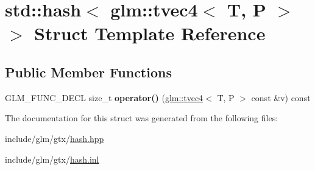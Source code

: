 \hypertarget{structstd_1_1hash_3_01glm_1_1tvec4_3_01T_00_01P_01_4_01_4}{}\section{std\+:\+:hash$<$ glm\+:\+:tvec4$<$ T, P $>$ $>$ Struct Template Reference}
\label{structstd_1_1hash_3_01glm_1_1tvec4_3_01T_00_01P_01_4_01_4}
\subsection*{Public Member Functions}
\begin{DoxyCompactItemize}
\item 
\mbox{\label{structstd_1_1hash_3_01glm_1_1tvec4_3_01T_00_01P_01_4_01_4_a019cfa9e9c08d44625fde235650a03dc}} 
G\+L\+M\+\_\+\+F\+U\+N\+C\+\_\+\+D\+E\+CL size\+\_\+t {\bfseries operator()} (\hyperlink{structglm_1_1tvec4}{glm\+::tvec4}$<$ T, P $>$ const \&v) const
\end{DoxyCompactItemize}


The documentation for this struct was generated from the following files\+:\begin{DoxyCompactItemize}
\item 
include/glm/gtx/\hyperlink{hash_8hpp}{hash.\+hpp}\item 
include/glm/gtx/\hyperlink{hash_8inl}{hash.\+inl}\end{DoxyCompactItemize}
